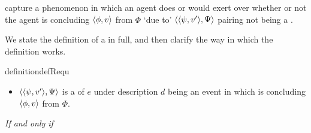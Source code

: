 \begin{note}
   capture a phenomenon in which an agent does or would exert \ninf{} over whether or not the agent is concluding \(\langle \phi, v \rangle\) from \(\Phi\) `due to' \(\langle \langle \psi, v' \rangle, \Psi \rangle\) pairing not being a \fc{}.

  We state the definition of a \requ{} in full, and then clarify the way in which the definition works.

  \begin{restatable}[A \requ{0}]{definition}{defRequ}
    \label{def:requ}


    \begin{itemize}
    \item
      \(\langle \langle \psi, v' \rangle, \Psi \rangle\) is a \emph{\requ{}} of \(e\) under description \(d\) being an event in which \vAgent{} is concluding \(\langle \phi, v \rangle\) from \(\Phi\).
    \end{itemize}

    \emph{If and only if}


\end{restatable}
\end{note}
